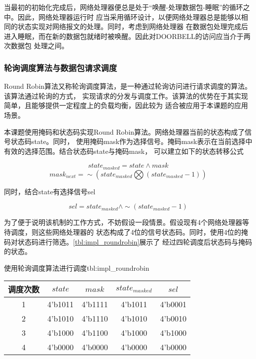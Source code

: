 
当最初的初始化完成后，网络处理器便总是处于“唤醒-处理数据包-睡眠”的循环之中。因此，网络处理器运行时
应当采用循环设计，以便网络处理器总是能够以相同的状态实现对网络报文的处理。同时，考虑到网络处理器
在数据包处理完成后进入睡眠，而在新的数据包就绪时被唤醒。因此对DOORBELL的访问应当介于两次数据包
处理之间。

\subsubsection{轮询调度算法与数据包请求调度}

Round Robin算法又称轮询调度算法，是一种通过轮询访问进行请求调度的算法。该算法通过轮询的方式，
实现请求的分发与调度工作。该算法的优势在于其实现简单，且能够提供一定程度上的负载均衡，因此较为
适合被应用于本课题的应用场景。

本课题使用掩码和状态码实现Round Robin算法。网络处理器当前的状态构成了信号状态码state。同时，
使用掩码mask作为选择信号。掩码mask表示在当前选择中有效的选择范围。结合状态码state与掩码mask，
可以建立如下的状态转移公式

\begin{equation}
state_{masked} = state \land mask
\end{equation}
\begin{equation}
mask_{next} = \sim (state_{masked} \bigotimes (state_{masked} - 1))
\end{equation}

同时，结合state有选择信号sel

\begin{equation}
sel = state_{masked} \land \sim (state_{masked}-1)
\end{equation}

为了便于说明该机制的工作方式，不妨假设一段情景。假设现有4个网络处理器等待调度，则这些网络处理器的
状态构成了4位的信号状态码。同时，使用4位的掩码对状态码进行筛选。\autoref{tbl:impl_roundrobin}展示了
经过四轮调度后状态码与掩码的状态。

\begin{generaltab}{使用轮询调度算法进行调度}{tbl:impl_roundrobin}
  \begin{tabular}{c|cccc}
    \toprule
    调度次数 & $state$ & $mask$ & $state_{masked}$ & $sel$ \\
    \midrule
    1 & 4'b1011 & 4'b1111 & 4'b1011 & 4'b0001 \\
    2 & 4'b1010 & 4'b1110 & 4'b1010 & 4'b0010 \\
    3 & 4'b1000 & 4'b1100 & 4'b1000 & 4'b1000 \\
    4 & 4'b0000 & 4'b0000 & 4'b0000 & 4'b0000 \\
    \bottomrule
  \end{tabular}
\end{generaltab}


